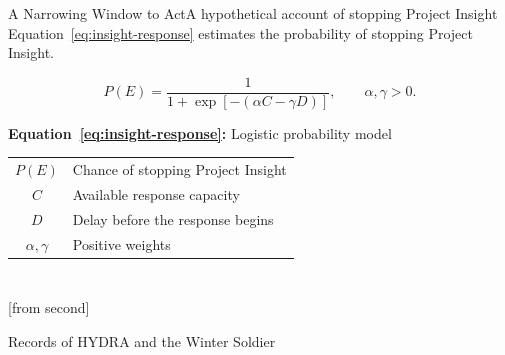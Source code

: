 \begin{frame}{A Narrowing Window to Act}{A hypothetical account of stopping Project Insight}
    Equation~\eqref{eq:insight-response} estimates the probability of stopping Project Insight.
    \begin{SlideFormulaLegend}
    {\Large
    \begin{equation}
        P(E)=\frac{1}{1+\exp[-(\alpha C-\gamma D)]},\qquad \alpha,\gamma>0.
        \label{eq:insight-response}
    \end{equation}}
    {\footnotesize\textbf{Equation~\ref{eq:insight-response}:} Logistic probability model\par}
    \bigskip
    {\footnotesize
    \begin{tabular}{@{}cl@{}}
        $P(E)$ & Chance of stopping Project Insight\\
        $C$ & Available response capacity\\
        $D$ & Delay before the response begins\\
        $\alpha,\gamma$ & Positive weights\\
    \end{tabular}}
    \end{SlideFormulaLegend}
\end{frame}

\section{}
[from second]
\begin{frame}[allowframebreaks]{}{Records of HYDRA and the Winter Soldier}
    \begin{SlideReferences}
    
    
    \end{SlideReferences}
\end{frame}

